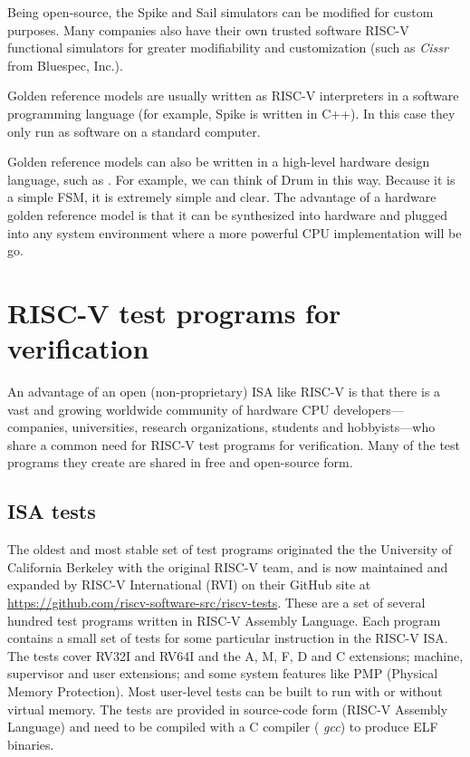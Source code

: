 Being open-source, the Spike and Sail simulators can be modified for
custom purposes.  Many companies also have their own trusted software
RISC-V functional simulators for greater modifiability and
customization (such as \emph{Cissr} from Bluespec, Inc.).

Golden reference models are usually written as RISC-V interpreters in
a software programming language (for example, Spike is written in
C++).  In this case they only run as software on a standard computer.

Golden reference models can also be written in a high-level hardware
design language, such as {\BSV}.  For example, we can think of Drum in
this way.  Because it is a simple FSM, it is extremely simple and
clear.  The advantage of a hardware golden reference model is that it
can be synthesized into hardware and plugged into any system
environment where a more powerful CPU implementation will be go.


\section{RISC-V test programs for verification}

\label{Sec_test_suites}

An advantage of an open (non-proprietary) ISA like RISC-V is that
there is a vast and growing worldwide community of hardware CPU
developers---companies, universities, research organizations, students
and hobbyists---who share a common need for RISC-V test programs for
verification.  Many of the test programs they create are shared in
free and open-source form.


\subsection{ISA tests}

The oldest and most stable set of test programs originated the the
University of California Berkeley with the original RISC-V team, and
is now maintained and expanded by RISC-V International (RVI) on their
GitHub site at
\url{https://github.com/riscv-software-src/riscv-tests}.  These are a
set of several hundred test programs written in RISC-V Assembly
Language.  Each program contains a small set of tests for some
particular instruction in the RISC-V ISA.  The tests cover RV32I and
RV64I and the A, M, F, D and C extensions; machine, supervisor and
user extensions; and some system features like PMP (Physical Memory
Protection).  Most user-level tests can be built to run with or
without virtual memory.  The tests are provided in source-code form
(RISC-V Assembly Language) and need to be compiled with a C compiler
({\eg} \emph{gcc}) to produce ELF binaries.

